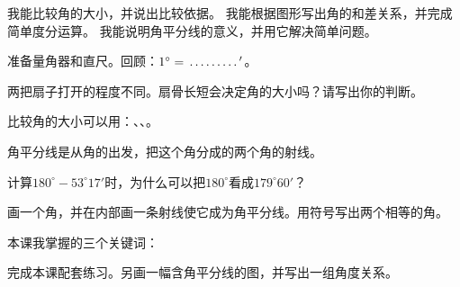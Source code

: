 \documentclass[UTF8,a4paper,11pt]{ctexart}
\begin{document}
\StudentHeader

\ObjectiveList
{我能比较角的大小，并说出比较依据。}
{我能根据图形写出角的和差关系，并完成简单度分运算。}
{我能说明角平分线的意义，并用它解决简单问题。}

准备量角器和直尺。回顾：\(1^\circ=\makebox[0.12\linewidth]{\dotfill}'\)。

两把扇子打开的程度不同。扇骨长短会决定角的大小吗？请写出你的判断。


\begin{center}
\AngleSumFigure
\end{center}

比较角的大小可以用：\makebox[0.18\linewidth]{\dotfill}、\makebox[0.18\linewidth]{\dotfill}、\makebox[0.18\linewidth]{\dotfill}。

角平分线是从角的\makebox[0.18\linewidth]{\dotfill}出发，把这个角分成\makebox[0.18\linewidth]{\dotfill}的两个角的射线。

\begin{center}
\StraightAngleFigure
\end{center}

\begin{center}
\AngleBisectorFigure
\end{center}

\begin{center}
\AnglePracticeFigure
\end{center}
\studentSpace[5]

计算\(180^\circ-53^\circ17'\)时，为什么可以把\(180^\circ\)看成\(179^\circ60'\)？

画一个角，并在内部画一条射线使它成为角平分线。用符号写出两个相等的角。

本课我掌握的三个关键词：


完成本课配套练习。另画一幅含角平分线的图，并写出一组角度关系。
\end{document}
